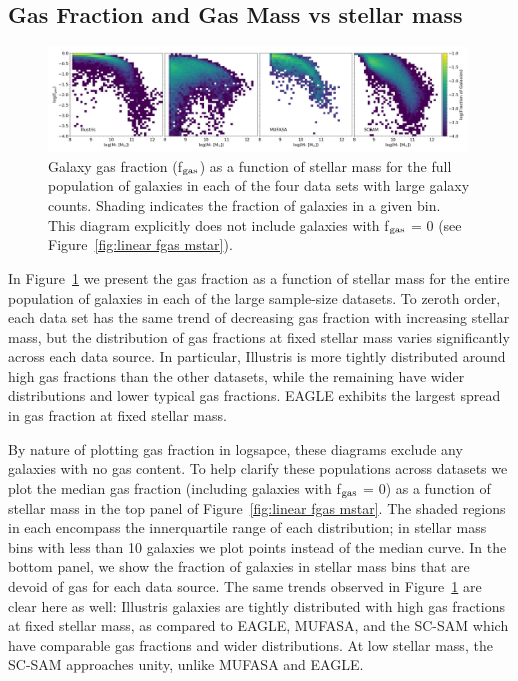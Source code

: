 \documentclass[fleqn,usenatbib]{mnras}
\begin{document}
\subsection{Gas Fraction and Gas Mass vs stellar mass}
\label{sec:results:fg Mstar}

\begin{figure}
\includegraphics[width = 0.99\textwidth]{fgas_mstar_2D_log_fgas.png}
\caption{Galaxy gas fraction (f$_{\rm gas}$) as a function of stellar mass for the full population of galaxies in each of the four data sets with large galaxy counts. Shading indicates the fraction of galaxies in a given bin. This diagram explicitly does not include galaxies with f$_{\rm gas}$ = 0 (see Figure~\ref{fig:linear fgas mstar}).}
\label{fig:fgas mstar 2D}
\end{figure}

In Figure~\ref{fig:fgas mstar 2D} we present the gas fraction as a function of stellar mass for the entire population of galaxies in each of the large sample-size datasets. To zeroth order, each data set has the same trend of decreasing gas fraction with increasing stellar mass, but the distribution of gas fractions at fixed stellar mass varies significantly across each data source. In particular, Illustris is more tightly distributed around high gas fractions than the other datasets, while the remaining have wider distributions and lower typical gas fractions. EAGLE exhibits the largest spread in gas fraction at fixed stellar mass. 

By nature of plotting gas fraction in logsapce, these diagrams exclude any galaxies with no gas content. To help clarify these populations across datasets we plot the median gas fraction (including galaxies with f$_{\rm gas}$ = 0) as a function of stellar mass in the top panel of Figure~\ref{fig:linear fgas mstar}. The shaded regions in each encompass the innerquartile range of each distribution; in stellar mass bins with less than 10 galaxies we plot points instead of the median curve. In the bottom panel, we show the fraction of galaxies in stellar mass bins that are devoid of gas for each data source. The same trends observed in Figure~\ref{fig:fgas mstar 2D} are clear here as well: Illustris galaxies are tightly distributed with high gas fractions at fixed stellar mass, as compared to EAGLE, MUFASA, and the SC-SAM which have comparable gas fractions and wider distributions. At low stellar mass, the SC-SAM approaches unity, unlike MUFASA and EAGLE. 
\end{document}

